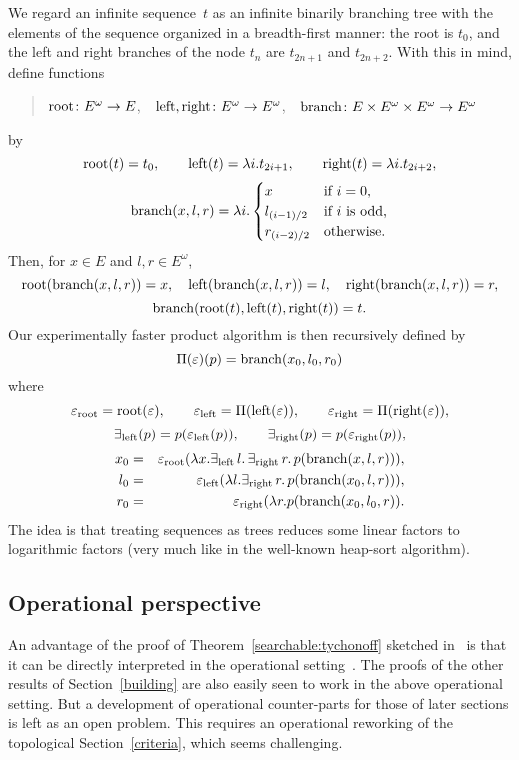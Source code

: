 \documentclass{LMCS}
\newcommand{\e}{\varepsilon}
\newcommand{\myomega}{\omega}
\begin{document}
We regard an infinite sequence~$t$ as an infinite binarily
branching tree with the elements of the sequence organized in a
breadth-first manner: the root is $t_0$, and the left and right
branches of the node $t_n$ are $t_{2n+1}$ and $t_{2n+2}$.  With this
in mind, define functions
\begin{quote}
  $\Root \colon E^\myomega \to E$, \,\, $\Left,\Right \colon E^\myomega \to
  E^\myomega$, \,\, $\branch \colon E \times E^\myomega \times E^\myomega \to
  E^\myomega$
\end{quote}
by
\[
\operatorname{root}(t) = t_0, \qquad
\operatorname{left} (t) = \lambda i. t_{2i + 1}, \qquad
\operatorname{right}(t) = \lambda i. t_{2i + 2},
\]
\[
\operatorname{branch}(x,l,r) = \lambda i.
\begin{cases}
x & \text{if $i = 0$,} \\
l_{(i-1)/2} & \text{if $i$ is odd,} \\
r_{(i-2)/2} & \text{otherwise.}
\end{cases}
\]
Then, for $x \in E$ and $l,r \in E^\myomega$,
\[
\operatorname{root}(\operatorname{branch}(x,l,r))=x, \quad
\operatorname{left}(\operatorname{branch}(x,l,r))= l, \quad
\operatorname{right}(\operatorname{branch}(x,l,r))=r, 
\]
\[
\operatorname{branch}(\operatorname{root}(t),\operatorname{left}(t),\operatorname{right}(t))=t.
\]
Our experimentally faster product algorithm is then recursively defined by
\[
\Pi(\e)(p) = \branch(x_0,l_0,r_0)
\]
where
\[
  \e_{\Root}  =  \Root(\e), \qquad
  \e_{\Left}  =  \Pi(\Left(\e)), \qquad
  \e_{\Right}  =  \Pi(\Right(\e)),
\]
\[  \exists_{\Left}(p)  = p(\e_{\Left}(p)), \qquad
  \exists_{\Right}(p)  =  p(\e_{\Right}(p)),
\]
\begin{eqnarray*}
x_0 & = & \e_{\Root}(\lambda x.\exists_{\Left} \,l.\,\exists_{\Right} \,r.\,p(\branch(x,l,r))),
\\  l_0 & = & \e_{\Left}(\lambda l.\exists_{\Right} \,r.\,p(\branch(x_0,l,r))),
\\  r_0 & = & \e_{\Right}(\lambda r.p(\branch(x_0,l_0,r)).
\end{eqnarray*}
The idea is that treating sequences as trees reduces some linear
factors to logarithmic factors (very much like in the well-known
heap-sort algorithm).


\subsection{Operational perspective}
An advantage of the proof of Theorem~\ref{searchable:tychonoff}
sketched in~\cite{escardo:lics07} is that it can be directly
interpreted in the operational
setting~\cite{escardo:barbados,escardo:ho}.  The proofs of the other
results of Section~\ref{building} are also easily seen to work in the
above operational setting.  But a development of operational
counter-parts for those of later sections is left as an open problem.
This requires an operational reworking of the topological
Section~\ref{criteria}, which seems challenging.
\end{document}
